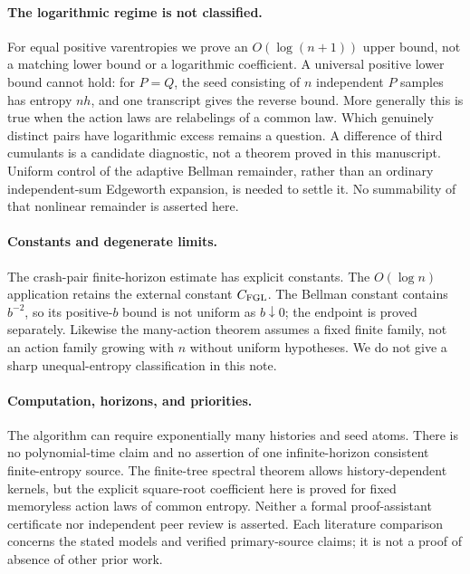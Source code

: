 \documentclass[11pt,a4paper]{article}
\begin{document}
\paragraph{The logarithmic regime is not classified.}
For equal positive varentropies we prove an $O(\log(n+1))$ upper bound,
not a matching lower bound or a logarithmic coefficient. A universal
positive lower bound cannot hold: for $P=Q$, the seed consisting of
$n$ independent $P$ samples has entropy $nh$, and one transcript gives
the reverse bound. More generally this is true when the action laws
are relabelings of a common law. Which genuinely distinct pairs have
logarithmic excess remains a question. A difference of third cumulants
is a candidate diagnostic, not a theorem proved in this manuscript.
Uniform control of the adaptive Bellman remainder, rather than an
ordinary independent-sum Edgeworth expansion, is needed to settle it.
No summability of that nonlinear remainder is asserted here.

\paragraph{Constants and degenerate limits.}
The crash-pair finite-horizon estimate has explicit constants. The
$O(\log n)$ application retains the external constant $C_{\rm FGL}$.
The Bellman constant contains $b^{-2}$, so its positive-$b$ bound is
not uniform as $b\downarrow0$; the endpoint is proved separately.
Likewise the many-action theorem assumes a fixed finite family, not
an action family growing with $n$ without uniform hypotheses.
We do not give a sharp unequal-entropy classification in this note.

\paragraph{Computation, horizons, and priorities.}
The algorithm can require exponentially many histories and seed atoms.
There is no polynomial-time claim and no assertion of one
infinite-horizon consistent finite-entropy source. The finite-tree
spectral theorem allows history-dependent kernels, but the explicit
square-root coefficient here is proved for fixed memoryless action
laws of common entropy. Neither a formal proof-assistant certificate
nor independent peer review is asserted. Each literature comparison
concerns the stated models and verified primary-source claims; it is
not a proof of absence of other prior work.
\end{document}
